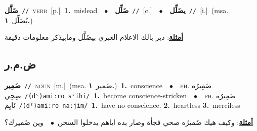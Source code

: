 \documentclass[10pt,a4paper,twoside]{article} %
\begin{document}
\begin{multicols}{2}
{\setlength\topsep{0pt}\textbf{\foreignlanguage{arabic}{ضَلَّل}}\ {\color{gray}\texttt{//}\color{black}}\ \textsc{verb}\ [p.]\ \textbf{1.}~mislead\ \ $\bullet$\ \ \setlength\topsep{0pt}\textbf{\foreignlanguage{arabic}{ضَلِّل}}\ {\color{gray}\texttt{//}\color{black}}\ [c.]\ \ $\bullet$\ \ \setlength\topsep{0pt}\textbf{\foreignlanguage{arabic}{يضَلِّل}}\ {\color{gray}\texttt{//}\color{black}}\ [i.]\ \color{gray}(msa. \foreignlanguage{arabic}{يُضَلِّل}~\foreignlanguage{arabic}{\textbf{١.}})\color{black}\  \begin{flushright}\color{gray}\foreignlanguage{arabic}{\textbf{\underline{\foreignlanguage{arabic}{أمثلة}}}: دير بالك الاعلام العبري بيضَلَّل ومابيذكر معلومات دقيقة}\end{flushright}\color{black}} \vspace{2mm}

\vspace{-3mm}
\subsection*{\color{blue}\foreignlanguage{arabic}{ض.م.ر}\color{blue}{}} 

{\setlength\topsep{0pt}\textbf{\foreignlanguage{arabic}{ضَمِير}}\ {\color{gray}\texttt{//}\color{black}}\ \textsc{noun}\ [m.]\ \color{gray}(msa. \foreignlanguage{arabic}{ضَمير}~\foreignlanguage{arabic}{\textbf{١.}})\color{black}\ \textbf{1.}~conscience\ \ $\bullet$\ \ \textsc{ph.} \color{gray} \foreignlanguage{arabic}{ضَمِيرُه صِحِي}\color{black}\ {\color{gray}\texttt{/{\sffamily (dˤ)amiːro sˤiħi}/}\color{black}}\ \textbf{1.}~become conscience-stricken\ \ $\bullet$\ \ \textsc{ph.} \color{gray} \foreignlanguage{arabic}{ضَمِيرُه نَايِم}\color{black}\ {\color{gray}\texttt{/{\sffamily (dˤ)amiːro naːjim}/}\color{black}}\ \textbf{1.}~have no conscience.  \textbf{2.}~heartless  \textbf{3.}~merciless\  \begin{flushright}\color{gray}\foreignlanguage{arabic}{\textbf{\underline{\foreignlanguage{arabic}{أمثلة}}}: وكيف هيك ضَميرُه صحي فجأة وصار بده اياهم يدخلوا السجن\ $\bullet$\ \  وين ضَميرك؟}\end{flushright}\color{black}} \vspace{2mm}


\end{multicols}
\end{document}

